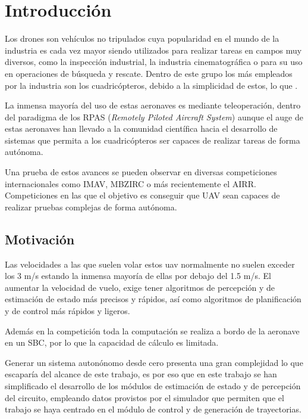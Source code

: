 \chapter{Introducción}
Los drones son vehículos no tripulados cuya popularidad en el mundo de la industria es cada vez mayor siendo utilizados para realizar tareas en campos muy diversos, como la inspección industrial, la industria cinematográfica o para su uso en operaciones de búsqueda y rescate. Dentro de este grupo los más empleados por la industria son los cuadricópteros, debido a la simplicidad de estos, lo que .

La inmensa mayoría del uso de estas aeronaves es mediante teleoperación, dentro del paradigma de los RPAS (\textit{Remotely Piloted Aircraft System}) aunque el auge de estas aeronaves han llevado a la comunidad científica hacia el desarrollo de sistemas que permita a los cuadricópteros ser capaces de realizar tareas de forma autónoma.

Una prueba de estos avances se pueden observar en diversas competiciones internacionales como IMAV, MBZIRC o más recientemente el AIRR. Competiciones en las que el objetivo es conseguir que UAV sean capaces de realizar pruebas complejas de forma autónoma.



\section{Motivación}

Las velocidades a las que suelen volar estos uav normalmente no suelen exceder los 3 m/s estando la inmensa mayoría de ellas por debajo del 1.5 m/s. El aumentar la velocidad de vuelo, exige tener algoritmos de percepción y de estimación de estado más precisos y rápidos, así como algoritmos de planificación y de control más rápidos y ligeros.

Además en la competición toda la computación se realiza a bordo de la aeronave en un SBC, por lo que la capacidad de cálculo es limitada.

Generar un sistema autonónomo desde cero presenta una gran complejidad lo que escaparía del alcance de este trabajo, es por eso que en este trabajo se han simplificado el desarrollo de los módulos de estimación de estado y de percepción del circuito, empleando datos provistos por el simulador que permiten que el trabajo se haya centrado en el módulo de control y de generación de trayectorias.

